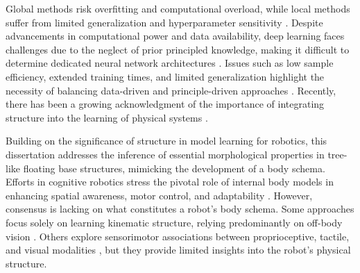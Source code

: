 \documentclass[12pt, a4paper]{article}
\begin{document}
Global methods risk overfitting and computational overload, while local methods suffer from limited generalization and hyperparameter sensitivity \cite{Thrun2002Probabilisticrobotics,Goodfellow2016DeepLearning}. Despite advancements in computational power and data availability, deep learning faces challenges due to the neglect of prior principled knowledge, making it difficult to determine dedicated neural network architectures \cite{Baker2017Designingneuralnetwork,Elsken2019Neuralarchitecturesearch}. Issues such as low sample efficiency, extended training times, and limited generalization highlight the necessity of balancing data-driven and principle-driven approaches \cite{Pierson2017Deeplearningrobotics,Suenderhauf2018limitspotentialsdeep}. Recently, there has been a growing acknowledgment of the importance of integrating structure into the learning of physical systems \cite{Geist2021Structuredlearningrigid,Lutter2023Combiningphysicsdeep}.

Building on the significance of structure in model learning for robotics, this dissertation addresses the inference of essential morphological properties in tree-like floating base structures, mimicking the development of a body schema. Efforts in cognitive robotics stress the pivotal role of internal body models in enhancing spatial awareness, motor control, and adaptability \cite{Nguyen2021Sensorimotorrepresentationlearning,Hoffmann2010Bodyschemarobotics}. However, consensus is lacking on what constitutes a robot's body schema. Some approaches focus solely on learning kinematic structure, relying predominantly on off-body vision \cite{Hersch2008Onlinelearningbody,MartinezCantin2010Bodyschemaacquisition,Hart2011roboticmodelecological,Lipson2019Taskagnosticself,Chen2022Fullybodyvisual,Sturm2009Bodyschemalearning}. Others explore sensorimotor associations between proprioceptive, tactile, and visual modalities \cite{Fuke2007BodyImageConstructed,Malinovska2022connectionistmodelassociating,Nguyen2019Reachingdevelopmentvisuo,Pugach2019BrainInspiredCoding,Lanillos2016Yieldingselfperception}, but they provide limited insights into the robot's physical structure.
\end{document}
